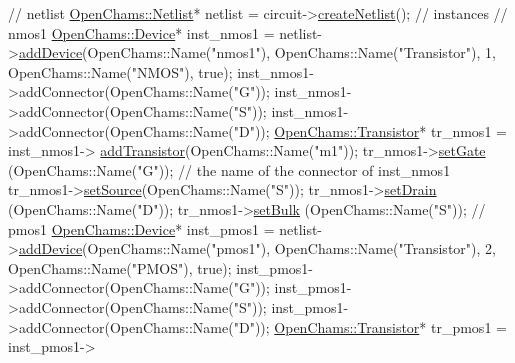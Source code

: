 \begin{DoxyCodeInclude}
    \textcolor{comment}{// netlist}
    \mbox{\hyperlink{class_open_chams_1_1_netlist}{OpenChams::Netlist}}* netlist = circuit->\mbox{\hyperlink{class_open_chams_1_1_circuit_a3f11671c7ea7b4e2cc3487bd7954b667}{createNetlist}}();
    \textcolor{comment}{//  instances}
    \textcolor{comment}{//   nmos1}
    \mbox{\hyperlink{class_open_chams_1_1_device}{OpenChams::Device}}* inst\_nmos1 = netlist->\mbox{\hyperlink{class_open_chams_1_1_netlist_a8e1798a2516c32fbab629ce8d60d4b1d}{addDevice}}(OpenChams::Name(\textcolor{stringliteral}{"nmos1"}), 
      OpenChams::Name(\textcolor{stringliteral}{"Transistor"}), 1, OpenChams::Name(\textcolor{stringliteral}{"NMOS"}), \textcolor{keyword}{true});
    inst\_nmos1->addConnector(OpenChams::Name(\textcolor{stringliteral}{"G"}));
    inst\_nmos1->addConnector(OpenChams::Name(\textcolor{stringliteral}{"S"}));
    inst\_nmos1->addConnector(OpenChams::Name(\textcolor{stringliteral}{"D"}));
    \mbox{\hyperlink{class_open_chams_1_1_transistor}{OpenChams::Transistor}}* tr\_nmos1 = inst\_nmos1->
      \mbox{\hyperlink{class_open_chams_1_1_device_ad45d34f8765dd113a5b12289efe66c07}{addTransistor}}(OpenChams::Name(\textcolor{stringliteral}{"m1"}));
    tr\_nmos1->\mbox{\hyperlink{class_open_chams_1_1_transistor_a705b53a51f0e265533b228f6e8beaf50}{setGate}}  (OpenChams::Name(\textcolor{stringliteral}{"G"})); \textcolor{comment}{// the name of the connector of inst\_nmos1}
    tr\_nmos1->\mbox{\hyperlink{class_open_chams_1_1_transistor_abc4a5d86e639ea13e27551722e2f9c17}{setSource}}(OpenChams::Name(\textcolor{stringliteral}{"S"}));
    tr\_nmos1->\mbox{\hyperlink{class_open_chams_1_1_transistor_a72ff8491040e3fdc1c8bd62b2392ab82}{setDrain}} (OpenChams::Name(\textcolor{stringliteral}{"D"}));
    tr\_nmos1->\mbox{\hyperlink{class_open_chams_1_1_transistor_a1484abe63e3f8ffbc2911c5230fa7091}{setBulk}}  (OpenChams::Name(\textcolor{stringliteral}{"S"}));
    \textcolor{comment}{//   pmos1}
    \mbox{\hyperlink{class_open_chams_1_1_device}{OpenChams::Device}}* inst\_pmos1 = netlist->\mbox{\hyperlink{class_open_chams_1_1_netlist_a8e1798a2516c32fbab629ce8d60d4b1d}{addDevice}}(OpenChams::Name(\textcolor{stringliteral}{"pmos1"}), 
      OpenChams::Name(\textcolor{stringliteral}{"Transistor"}), 2, OpenChams::Name(\textcolor{stringliteral}{"PMOS"}), \textcolor{keyword}{true});
    inst\_pmos1->addConnector(OpenChams::Name(\textcolor{stringliteral}{"G"}));
    inst\_pmos1->addConnector(OpenChams::Name(\textcolor{stringliteral}{"S"}));
    inst\_pmos1->addConnector(OpenChams::Name(\textcolor{stringliteral}{"D"}));
    \mbox{\hyperlink{class_open_chams_1_1_transistor}{OpenChams::Transistor}}* tr\_pmos1 = inst\_pmos1->

\end{DoxyCodeInclude}
